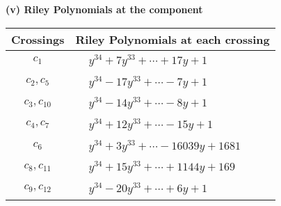 \documentclass[1p]{elsarticle_modified}
\theoremstyle{definition}
\begin{document}
\newpage\renewcommand{\arraystretch}{1}
\flushleft \textbf{(v) Riley Polynomials at the component}\newline \\
\begin{tabular}{m{50pt}|m{274pt}}
Crossings & \hspace{64pt}Riley Polynomials at each crossing \\
\hline $$\begin{aligned}c_{1}\end{aligned}$$&$\begin{aligned}
&y^{34}+7 y^{33}+\cdots+17 y+1
\end{aligned}$\\
\hline $$\begin{aligned}c_{2},c_{5}\end{aligned}$$&$\begin{aligned}
&y^{34}-17 y^{33}+\cdots-7 y+1
\end{aligned}$\\
\hline $$\begin{aligned}c_{3},c_{10}\end{aligned}$$&$\begin{aligned}
&y^{34}-14 y^{33}+\cdots-8 y+1
\end{aligned}$\\
\hline $$\begin{aligned}c_{4},c_{7}\end{aligned}$$&$\begin{aligned}
&y^{34}+12 y^{33}+\cdots-15 y+1
\end{aligned}$\\
\hline $$\begin{aligned}c_{6}\end{aligned}$$&$\begin{aligned}
&y^{34}+3 y^{33}+\cdots-16039 y+1681
\end{aligned}$\\
\hline $$\begin{aligned}c_{8},c_{11}\end{aligned}$$&$\begin{aligned}
&y^{34}+15 y^{33}+\cdots+1144 y+169
\end{aligned}$\\
\hline $$\begin{aligned}c_{9},c_{12}\end{aligned}$$&$\begin{aligned}
&y^{34}-20 y^{33}+\cdots+6 y+1
\end{aligned}$\\
\hline
\end{tabular}\\~\\
\end{document}
